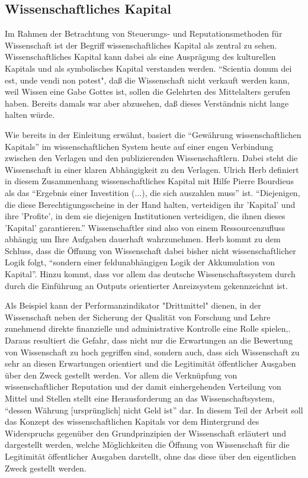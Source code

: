 \subsection{Wissenschaftliches Kapital}
Im Rahmen der Betrachtung von Steuerungs- und Reputationsmethoden für Wissenschaft ist der Begriff wissenschaftliches Kapital als zentral zu sehen\cite{suchen}. Wissenschaftliches Kapital kann dabei als eine Ausprägung des kulturellen Kapitals und als symbolisches Kapital\cite{irmer2011} verstanden werden. “Scientia donum dei est, unde vendi non potest", daß die Wissenschaft nicht verkauft werden kann, weil Wissen eine Gabe Gottes ist, sollen die Gelehrten des Mittelalters gerufen haben\cite{suchen}. Bereits damals war aber abzusehen, daß dieses Verständnis nicht lange halten würde.

Wie bereits in der Einleitung erwähnt, basiert die “Gewährung wissenschaftlichen Kapitals” im wissenschaftlichen System heute auf einer engen Verbindung zwischen den Verlagen und den publizierenden Wissenschaftlern\cite{herb_2006}. Dabei steht die Wissenschaft in einer klaren Abhängigkeit zu den Verlagen. Ulrich Herb definiert in diesem Zusammenhang wissenschaftliches Kapital mit Hilfe Pierre Bourdieus als das “Ergebnis einer Investition (...), die sich auszahlen muss” ist. “Diejenigen, die diese Berechtigungsscheine in der Hand halten, verteidigen ihr 'Kapital' und ihre 'Profite', in dem sie diejenigen Institutionen verteidigen, die ihnen dieses 'Kapital' garantieren.”\cite{Bourdieu_1992} Wissenschaftler sind also von einem Ressourcenzufluss abhängig um Ihre Aufgaben dauerhaft wahrzunehmen\cite{Suess_2006}. Herb kommt zu dem Schluss, dass die Öffnung von Wissenschaft dabei bisher nicht wissenschaftlicher Logik folgt, “sondern einer feldunabhängigen Logik der Akkumulation von Kapital”\cite{herb_2006}. Hinzu kommt, dass vor allem das deutsche Wissenschaftssystem durch durch die Einführung an Outputs orientierter Anreizsystem gekennzeichnt ist.\cite{osterloh2008anreize}

Als Beispiel kann der Performanzindikator "Drittmittel"\cite{Jansen_2007} dienen, in der Wissenschaft neben der Sicherung der Qualität von Forschung und Lehre zunehmend direkte finanzielle und administrative Kontrolle eine Rolle spielen\cite{Barl_sius_2008},. Daraus resultiert die Gefahr, dass nicht nur die Erwartungen an die Bewertung von Wissenschaft zu hoch gegriffen sind, sondern auch, dass sich Wissenschaft zu sehr an diesen Erwartungen orientiert und die Legitimität öffentlicher Ausgaben über den Zweck gestellt werden. Vor allem die Verknüpfung von wissenschaftlicher Reputation und der damit einhergehenden Verteilung von Mittel und Stellen stellt eine Herausforderung an das Wissenschaftsystem, “dessen Währung [ursprünglich] nicht Geld ist”\cite{hanekop_2006} dar. In diesem Teil der Arbeit soll das Konzept des wissenschaftlichen Kapitals vor dem Hintergrund des Widerspruchs gegenüber den Grundprinzipien der Wissenschaft erläutert und dargestellt werden, welche Möglichkeiten die Öffnung von Wissenschaft für die Legitimität öffentlicher Ausgaben darstellt, ohne das diese über den eigentlichen Zweck gestellt werden.
